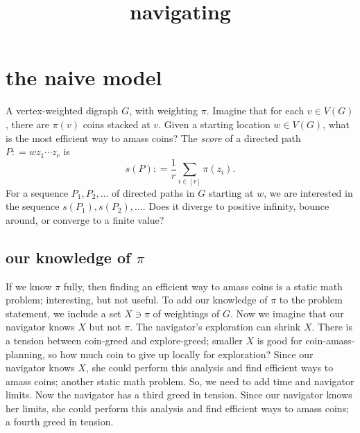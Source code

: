 \documentclass{amsbook}
\theoremstyle{plain}
\numberwithin{equation}{chapter}
\newcommand{\irange}[1]{\left[#1\right]}
\newcommand{\DefinedAs}{\mathrel{\mathop:}=}
\begin{document}
\frontmatter
\title[nav]{navigating}
\author{}
\maketitle
\tableofcontents

\chapter{the naive model}
A vertex-weighted digraph $G$, with weighting $\pi$.  Imagine that for each $v \in V(G)$, there are $\pi(v)$ coins stacked at $v$.
Given a starting location $w \in V(G)$, what is the most efficient way to amass coins?  The \emph{score} of a directed path $P \DefinedAs wz_1\cdots z_r$ is
\[s(P) \DefinedAs \frac{1}{r}\sum_{i \in \irange{r}} \pi(z_i).\]
For a sequence $P_1, P_2, \ldots$ of directed paths in $G$ starting at $w$, we are interested in the sequence $s(P_1), s(P_2), \ldots$.  Does it diverge to
positive infinity, bounce around, or converge to a finite value?

\section{our knowledge of $\pi$}
If we know $\pi$ fully, then finding an efficient way to amass coins is a static math problem; interesting, but not useful.
To add our knowledge of $\pi$ to the problem statement, we include a set $X \ni \pi$ of weightings of $G$.  Now we imagine
that our navigator knows $X$ but not $\pi$.  The navigator's exploration can shrink $X$.  
There is a tension between coin-greed and explore-greed; smaller $X$ is good for coin-amass-planning, so how much coin to give up locally for exploration?
Since our navigator knows $X$, she could perform this analysis and find efficient ways to amass coins; another static math problem.  So, we need to
add time and navigator limits.  Now the navigator has a third greed in tension.  Since our navigator knows her limits, she could perform this 
analysis and find efficient ways to amass coins; a fourth greed in tension.
\end{document}
